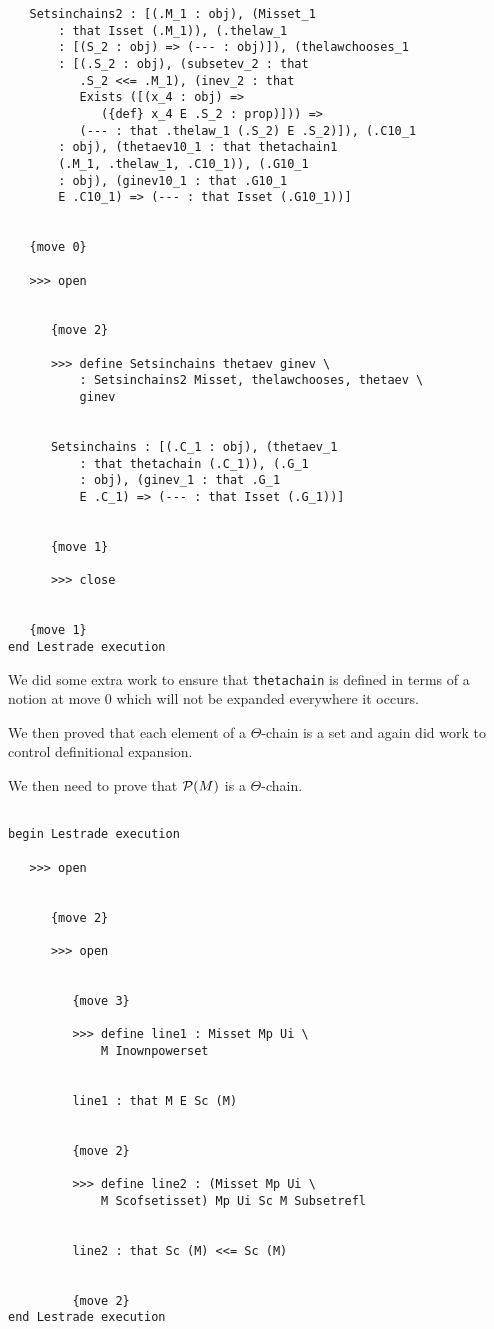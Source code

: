 \documentclass[12pt]{article}
\begin{document}
\begin{verbatim}
   Setsinchains2 : [(.M_1 : obj), (Misset_1 
       : that Isset (.M_1)), (.thelaw_1 
       : [(S_2 : obj) => (--- : obj)]), (thelawchooses_1 
       : [(.S_2 : obj), (subsetev_2 : that 
          .S_2 <<= .M_1), (inev_2 : that 
          Exists ([(x_4 : obj) => 
             ({def} x_4 E .S_2 : prop)])) => 
          (--- : that .thelaw_1 (.S_2) E .S_2)]), (.C10_1 
       : obj), (thetaev10_1 : that thetachain1 
       (.M_1, .thelaw_1, .C10_1)), (.G10_1 
       : obj), (ginev10_1 : that .G10_1 
       E .C10_1) => (--- : that Isset (.G10_1))]


   {move 0}

   >>> open


      {move 2}

      >>> define Setsinchains thetaev ginev \
          : Setsinchains2 Misset, thelawchooses, thetaev \
          ginev


      Setsinchains : [(.C_1 : obj), (thetaev_1 
          : that thetachain (.C_1)), (.G_1 
          : obj), (ginev_1 : that .G_1 
          E .C_1) => (--- : that Isset (.G_1))]


      {move 1}

      >>> close


   {move 1}
end Lestrade execution
\end{verbatim}

We did some extra work to ensure that {\tt thetachain} is defined in terms of a notion at move 0 which will not be expanded everywhere it occurs.

We then proved that each element of a $\Theta$-chain is a set and again did work to control definitional expansion.

We then need to prove that ${\cal P}(M)$ is a $\Theta$-chain.

\begin{verbatim}

begin Lestrade execution

   >>> open


      {move 2}

      >>> open


         {move 3}

         >>> define line1 : Misset Mp Ui \
             M Inownpowerset


         line1 : that M E Sc (M)


         {move 2}

         >>> define line2 : (Misset Mp Ui \
             M Scofsetisset) Mp Ui Sc M Subsetrefl


         line2 : that Sc (M) <<= Sc (M)


         {move 2}
end Lestrade execution
\end{verbatim}
\end{document}

